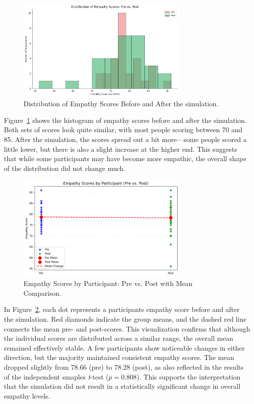 \begin{figure}[htbp]
    \centering
    \includegraphics[width=0.75\textwidth]{../../Figures/emp-comparison.png}
    \caption{Distribution of Empathy Scores Before and After the simulation.}
    \label{fig:empathy_dist_hist}
\end{figure}

Figure~\ref{fig:empathy_dist_hist} shows the histogram of empathy scores before and after the simulation. Both sets of scores look quite similar, with most people scoring between 70 and 85. After the simulation, the scores spread out a bit more—some people scored a little lower, but there is also a slight increase at the higher end. This suggests that while some participants may have become more empathic, the overall shape of the distribution did not change much.

\begin{figure}[htbp]
    \centering
    \includegraphics[width=0.75\textwidth]{../../Figures/emph-comparison-means.png}
    \caption{Empathy Scores by Participant: Pre vs. Post with Mean Comparison.}
    \label{fig:empathy_means_line}
\end{figure}

\vspace{1em}

In Figure~\ref{fig:empathy_means_line}, each dot represents a participants empathy score before and after the simulation. Red diamonds indicate the group means, and the dashed red line connects the mean pre- and post-scores. This visualization confirms that although the individual scores are distributed across a similar range, the overall mean remained effectively stable. A few participants show noticeable changes in either direction, but the majority maintained consistent empathy scores. The mean dropped slightly from 78.66 (pre) to 78.28 (post), as also reflected in the results of the independent smaples \textit{t}-test ($p = 0.808$). This supports the interpretation that the simulation did not result in a statistically significant change in overall empathy levels.

